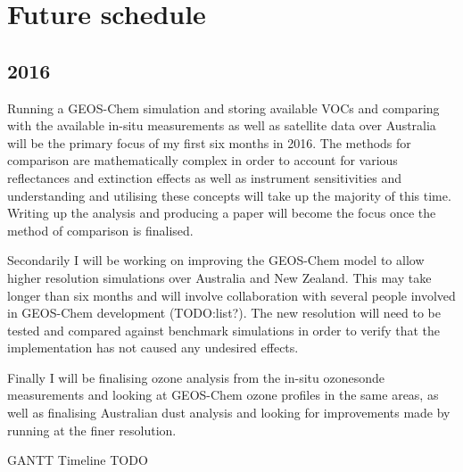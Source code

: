\section{Future schedule}

\subsection{2016}

Running a GEOS-Chem simulation and storing available VOCs and comparing with the available in-situ measurements as well as satellite data over Australia will be the primary focus of my first six months in 2016.
The methods for comparison are mathematically complex in order to account for various reflectances and extinction effects as well as instrument sensitivities and understanding and utilising these concepts will take up the majority of this time.
Writing up the analysis and producing a paper will become the focus once the method of comparison is finalised.

Secondarily I will be working on improving the GEOS-Chem model to allow higher resolution simulations over Australia and New Zealand.
This may take longer than six months and will involve collaboration with several people involved in GEOS-Chem development (TODO:list?).
The new resolution will need to be tested and compared against benchmark simulations in order to verify that the implementation has not caused any undesired effects.

Finally I will be finalising ozone analysis from the in-situ ozonesonde measurements and looking at GEOS-Chem ozone profiles in the same areas, as well as finalising Australian dust analysis and looking for improvements made by running at the finer resolution.

GANTT Timeline TODO
